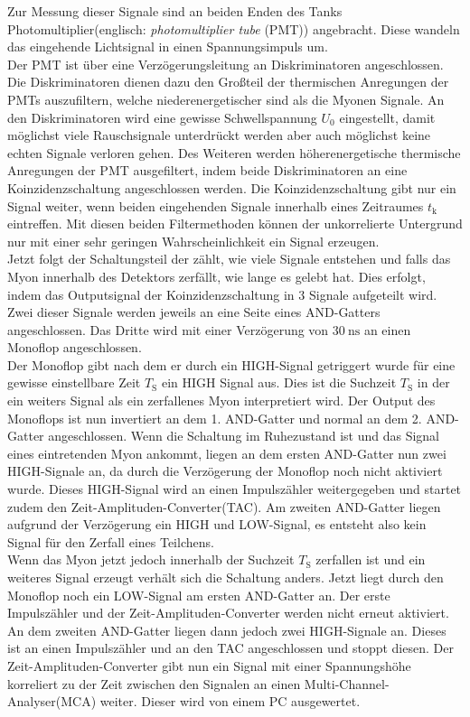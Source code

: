     Zur Messung dieser Signale sind an beiden Enden des Tanks Photomultiplier(englisch: \textit{photomultiplier tube} (PMT)) angebracht. Diese wandeln das eingehende Lichtsignal in einen Spannungsimpuls um. \\
    Der PMT ist über eine Verzögerungsleitung an Diskriminatoren angeschlossen.
    Die Diskriminatoren dienen dazu den Großteil der thermischen Anregungen der PMTs auszufiltern, welche niederenergetischer sind als die Myonen Signale.
    An den Diskriminatoren wird eine gewisse Schwellspannung $U_0$ eingestellt, damit möglichst viele Rauschsignale unterdrückt werden aber auch möglichst keine echten Signale verloren gehen.
    Des Weiteren werden höherenergetische thermische Anregungen der PMT ausgefiltert, indem beide Diskriminatoren an eine Koinzidenzschaltung angeschlossen werden.
    Die Koinzidenzschaltung gibt nur ein Signal weiter, wenn beiden eingehenden Signale innerhalb eines Zeitraumes $t_\text{k}$ eintreffen.
    Mit diesen beiden Filtermethoden können der unkorrelierte Untergrund nur mit einer sehr geringen Wahrscheinlichkeit ein Signal erzeugen.\\
    Jetzt folgt der Schaltungsteil der zählt, wie viele Signale entstehen und falls das Myon innerhalb des Detektors zerfällt, wie lange es gelebt hat.
    Dies erfolgt, indem das Outputsignal der Koinzidenzschaltung in 3 Signale aufgeteilt wird.
    Zwei dieser Signale werden jeweils an eine Seite eines AND-Gatters angeschlossen. 
    Das Dritte wird mit einer Verzögerung von $\SI{30}{\nano\second}$ an einen Monoflop angeschlossen.\\
    Der Monoflop gibt nach dem er durch ein HIGH-Signal getriggert wurde für eine gewisse einstellbare Zeit $T_\text{S}$ ein HIGH Signal aus. 
    Dies ist die Suchzeit $T_\text{S}$ in der ein weiters Signal als ein zerfallenes Myon interpretiert wird.
    Der Output des Monoflops ist nun invertiert an dem 1. AND-Gatter und normal an dem 2. AND-Gatter angeschlossen.
    Wenn die Schaltung im Ruhezustand ist und das Signal eines eintretenden Myon ankommt, 
    liegen an dem ersten AND-Gatter nun zwei HIGH-Signale an, da durch die Verzögerung der Monoflop noch nicht aktiviert wurde.
    Dieses HIGH-Signal wird an einen Impulszähler weitergegeben und startet zudem den Zeit-Amplituden-Converter(TAC).
    Am zweiten AND-Gatter liegen aufgrund der Verzögerung ein HIGH und LOW-Signal, es entsteht also kein Signal für den Zerfall eines Teilchens.\\
    Wenn das Myon jetzt jedoch innerhalb der Suchzeit $T_\text{S}$ zerfallen ist und ein weiteres Signal erzeugt verhält sich die Schaltung anders.
    Jetzt liegt durch den Monoflop noch ein LOW-Signal am ersten AND-Gatter an.
    Der erste Impulszähler und der Zeit-Amplituden-Converter werden nicht erneut aktiviert.
    An dem zweiten AND-Gatter liegen dann jedoch zwei HIGH-Signale an. Dieses ist an einen Impulszähler und an den TAC angeschlossen und stoppt diesen.
    Der Zeit-Amplituden-Converter gibt nun ein Signal mit einer Spannungshöhe korreliert zu der Zeit zwischen den Signalen an einen Multi-Channel-Analyser(MCA) weiter.
    Dieser wird von einem PC ausgewertet.

